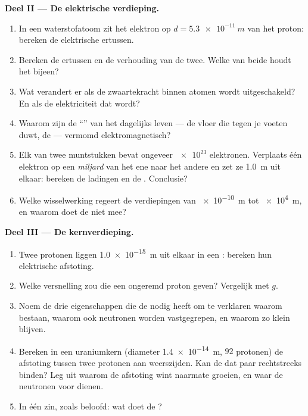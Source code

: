 \begin{problem}
\medskip
\noindent\textbf{Deel II --- De elektrische verdieping.}
\begin{enumerate}[resume]
  \item In een waterstofatoom zit het elektron op $d = \qty{5.3e-11}{m}$
        van het proton: bereken de elektrische  ertussen.
  \item Bereken de  ertussen en de verhouding van de
        twee. Welke van beide houdt het  bijeen?
  \item Wat verandert er als de zwaartekracht binnen atomen wordt
        uitgeschakeld? En als de elektriciteit dat wordt?
  \item Waarom zijn de ``'' van het dagelijks leven --- de
        vloer die tegen je voeten duwt, de  --- vermomd
        elektromagnetisch?
  \item Elk van twee muntstukken bevat ongeveer $\num{e23}$ elektronen.
        Verplaats één elektron op een \emph{miljard} van het ene naar het
        andere en zet ze \qty{1.0}{m} uit elkaar: bereken de ladingen en
        de . Conclusie?
  \item Welke wisselwerking regeert de verdiepingen van \qty{e-10}{m} tot
        \qty{e4}{m}, en waarom doet de  niet mee?
\end{enumerate}

\medskip
\noindent\textbf{Deel III --- De kernverdieping.}
\begin{enumerate}[resume]
  \item Twee protonen liggen \qty{1.0e-15}{m} uit elkaar in een :
        bereken hun elektrische afstoting.
  \item Welke versnelling zou die  een ongeremd proton geven?
        Vergelijk met $g$.
  \item Noem de drie eigenschappen die de  nodig
        heeft om te verklaren waarom  bestaan, waarom ook neutronen
        worden vastgegrepen, en waarom  zo klein blijven.
  \item Bereken in een uraniumkern (diameter \qty{1.4e-14}{m}, $92$
        protonen) de afstoting tussen twee protonen aan weerszijden. Kan
        de  dat paar rechtstreeks binden? Leg uit
        waarom de afstoting wint naarmate  groeien, en waar de
        neutronen voor dienen.
  \item In één zin, zoals beloofd: wat doet de ?
\end{enumerate}


\end{problem}
